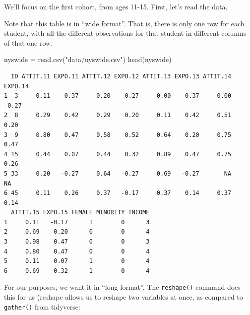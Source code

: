 \documentclass[
  letterpaper,
  DIV=11,
  numbers=noendperiod]{scrreprt}
\newenvironment{Shaded}{\begin{snugshade}}{\end{snugshade}}
\newcommand{\FunctionTok}[1]{\textcolor[rgb]{0.02,0.16,0.49}{#1}}
\newcommand{\NormalTok}[1]{\textcolor[rgb]{0.00,0.44,0.13}{#1}}
\newcommand{\OtherTok}[1]{\textcolor[rgb]{0.00,0.44,0.13}{#1}}
\newcommand{\StringTok}[1]{\textcolor[rgb]{0.25,0.44,0.63}{#1}}
\begin{document}
We'll focus on the first cohort, from ages 11-15. First, let's read the
data.

Note that this table is in ``wide format''. That is, there is only one
row for each student, with all the different observations for that
student in different columns of that one row.

\begin{Shaded}
\begin{Highlighting}[]
\NormalTok{nyswide }\OtherTok{=} \FunctionTok{read.csv}\NormalTok{(}\StringTok{"data/nyswide.csv"}\NormalTok{)}
\FunctionTok{head}\NormalTok{(nyswide)}
\end{Highlighting}
\end{Shaded}

\begin{verbatim}
  ID ATTIT.11 EXPO.11 ATTIT.12 EXPO.12 ATTIT.13 EXPO.13 ATTIT.14 EXPO.14
1  3     0.11   -0.37     0.20   -0.27     0.00   -0.37     0.00   -0.27
2  8     0.29    0.42     0.29    0.20     0.11    0.42     0.51    0.20
3  9     0.80    0.47     0.58    0.52     0.64    0.20     0.75    0.47
4 15     0.44    0.07     0.44    0.32     0.89    0.47     0.75    0.26
5 33     0.20   -0.27     0.64   -0.27     0.69   -0.27       NA      NA
6 45     0.11    0.26     0.37   -0.17     0.37    0.14     0.37    0.14
  ATTIT.15 EXPO.15 FEMALE MINORITY INCOME
1     0.11   -0.17      1        0      3
2     0.69    0.20      0        0      4
3     0.98    0.47      0        0      3
4     0.80    0.47      0        0      4
5     0.11    0.07      1        0      4
6     0.69    0.32      1        0      4
\end{verbatim}

For our purposes, we want it in ``long format''. The \texttt{reshape()}
command does this for us (reshape allows us to reshape two variables at
once, as compared to \texttt{gather()} from tidyverse:
\end{document}
